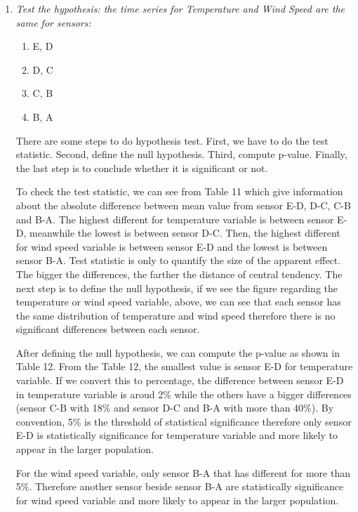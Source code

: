 \documentclass[a4paper,12pt]{article} %
\begin{document}
\begin{enumerate}
\item {\it Test the hypothesis: the time series for Temperature and Wind Speed are the same for sensors:}
\begin{enumerate}
	\item{E, D}
	\item {D, C}
	\item {C, B}
	\item {B, A}
\end{enumerate}

There are some steps to do hypothesis test. First, we have to do the test statistic. Second, define the null hypothesis. Third, compute p-value. Finally, the last step is to conclude whether it is significant or not. 

To check the test statistic, we can see from Table 11 which give information about the absolute difference between mean value from sensor E-D, D-C, C-B and B-A. The highest different for temperature variable is between sensor E-D, meanwhile the lowest is between sensor D-C. Then, the highest different for wind speed variable is between sensor E-D and the lowest is between sensor B-A. Test statistic is only to quantify the size of the apparent effect. The bigger the differences, the farther the distance of central tendency. The next step is to define the null hypothesis, if we see the figure regarding the temperature or wind speed variable, above, we can see that each sensor has the same distribution of temperature and wind speed therefore there is no significant differences between each sensor. 

After defining the null hypothesis, we can compute the p-value as shown in Table 12. From the Table 12, the smallest value is sensor E-D for temperature variable. If we convert this to percentage, the difference between sensor E-D in temperature variable is aroud 2\% while the others have a bigger differences (sensor C-B with 18\% and sensor D-C and B-A with more than 40\%). By convention, 5\% is the threshold of statistical significance therefore only sensor E-D is statistically significance for temperature variable and more likely to appear in the larger population. 

For the wind speed variable, only sensor B-A that has different for more than 5\%. Therefore another sensor beside sensor B-A are statistically significance for wind speed variable and more likely to appear in the larger population.


\end{enumerate}
\end{document}
